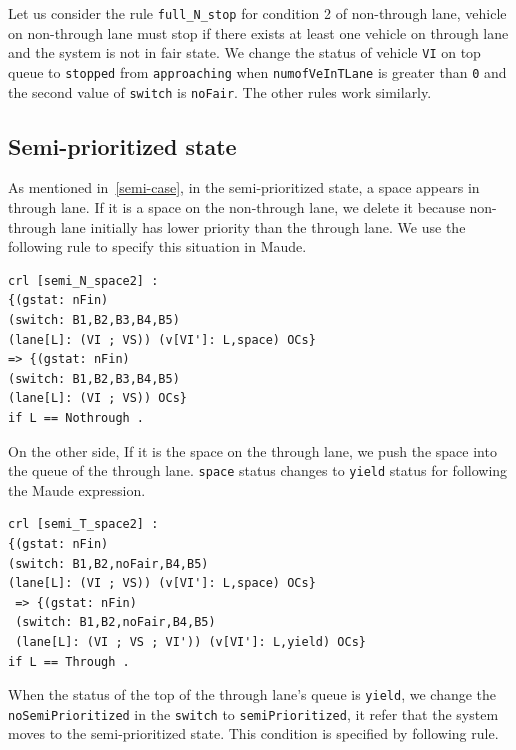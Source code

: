 \documentclass[10pt, conference, compsocconf]{IEEEtran}
\begin{document}
\noindent Let us consider the rule \verb!full_N_stop! for condition 2 of non-through lane, vehicle on non-through lane must stop if there exists at least one vehicle on through lane and the system is not in fair state.
We change the status of vehicle \verb!VI! on top queue to \verb!stopped! from \verb!approaching! when \verb!numofVeInTLane! is greater than \verb!0! and the second value of \verb!switch! is \verb!noFair!.
The other rules work similarly.




\subsection{Semi-prioritized state}

As mentioned in~\ref{semi-case}, in the semi-prioritized state, a space appears in through lane.
If it is a space on the non-through lane, we delete it because non-through lane initially has lower priority than the through lane.
We use the following rule to specify this situation in Maude.

\begin{footnotesize}
\begin{verbatim}
crl [semi_N_space2] : 
{(gstat: nFin) 
(switch: B1,B2,B3,B4,B5) 
(lane[L]: (VI ; VS)) (v[VI']: L,space) OCs} 
=> {(gstat: nFin) 
(switch: B1,B2,B3,B4,B5) 
(lane[L]: (VI ; VS)) OCs} 
if L == Nothrough .
\end{verbatim}
\end{footnotesize}

\noindent On the other side, If it is the space on the through lane, we push the space into the queue of the through lane.
\verb!space! status changes to \verb!yield! status for following the Maude expression.

\begin{footnotesize}
\begin{verbatim}
crl [semi_T_space2] : 
{(gstat: nFin) 
(switch: B1,B2,noFair,B4,B5) 
(lane[L]: (VI ; VS)) (v[VI']: L,space) OCs} 
 => {(gstat: nFin) 
 (switch: B1,B2,noFair,B4,B5) 
 (lane[L]: (VI ; VS ; VI')) (v[VI']: L,yield) OCs} 
if L == Through .
\end{verbatim}
\end{footnotesize}

When the status of the top of the through lane's queue is \verb!yield!, we change the \verb!noSemiPrioritized! in the \verb!switch! to \verb!semiPrioritized!, it refer that the system moves to the semi-prioritized state.
This condition is specified by following rule.
\end{document}
